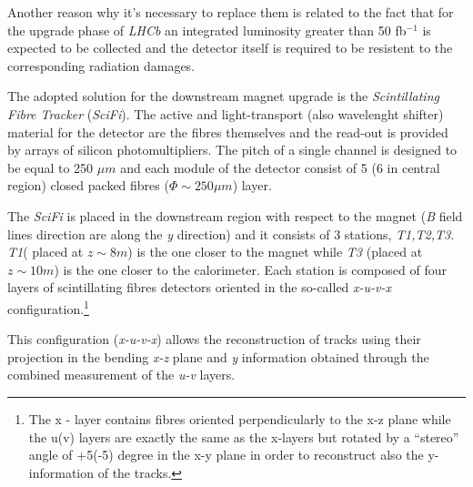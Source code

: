 \documentclass[paper=a4, fontsize=10pt]{scrartcl}
\numberwithin{equation}{section}		%
\numberwithin{figure}{section}			%
\numberwithin{table}{section}				%
\begin{document}

Another reason why it's necessary to replace them is related to the fact that for the upgrade phase of \textit{LHCb} an integrated luminosity greater than 50 fb$^{-1}$ is expected to be collected and the detector itself is required to be resistent to the corresponding radiation damages.

The adopted solution for the downstream magnet upgrade is the \textit{Scintillating Fibre Tracker} (\textit{SciFi}). The active and light-transport (also wavelenght shifter) material for the detector are the fibres themselves and the read-out is provided by arrays of silicon photomultipliers. The pitch of a single channel is designed to be equal to 250 $\mu m$ and each module of the detector consist of 5 (6 in central region) closed packed fibres ($\Phi \sim 250 \mu m$) layer.

 
The \textit{SciFi} is placed in the downstream region with respect to the magnet (\textit{B} field lines direction are along the \textit{y} direction) and it consists of 3 stations, \textit{T1,T2,T3}. \textit{T1}( placed at $z\sim 8m$) is the one closer to the magnet while \textit{T3} (placed at $z\sim 10m$) is the one closer to the calorimeter. Each station is composed of four layers of scintillating fibres detectors oriented in the so-called \textit{x-u-v-x} configuration.\footnote{The x - layer contains fibres oriented perpendicularly to the x-z plane while the u(v) layers are exactly the same as the x-layers but rotated by a ``stereo'' angle of +5(-5) degree in the x-y plane in order to reconstruct also the y-information of the tracks.}

This configuration (\textit{x-u-v-x}) allows the reconstruction of tracks using their projection in the bending \textit{x-z} plane and \textit{y} information obtained through the combined measurement of the \textit{u-v} layers.%
\end{document}
